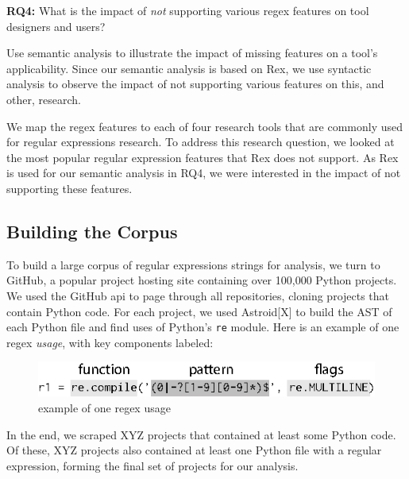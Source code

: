 \textbf{RQ4:} What is the impact of \emph{not} supporting various regex features on tool designers and users?

Use semantic analysis to illustrate the impact of missing features on a tool's applicability. Since our semantic analysis is based on Rex, we use syntactic analysis to observe the impact of not supporting various features on this, and other, research.


We map the regex features to each of four research tools that are commonly used for regular expressions research.
To address this research question, we looked at the most popular regular expression features that Rex does not support. As Rex is used for our semantic analysis in RQ4, we were interested in the impact of not supporting these features.





\subsection{Building the Corpus}
\label{study:corpus}
To build a large corpus of regular expressions strings for analysis, we turn to GitHub, a popular project hosting site containing over 100,000 Python projects. 
We used the GitHub api to page through all repositories, cloning projects that contain Python code. 
 For each project, we used Astroid[X] to build the AST of each Python file and find uses of Python's {\tt re} module.  Here is an example of one regex \emph{usage}, with key components labeled:

\begin{figure}[htb]
\centering
\includegraphics[width=\columnwidth]{../illustrations/exampleUsage.eps}
\caption{example of one regex usage}
\label{fig:exampleUsage}
\end{figure}

In the end, we scraped XYZ projects that contained at least some Python code. Of these, XYZ projects also contained at least one Python file with a regular expression, forming the final set of projects for our analysis. 

